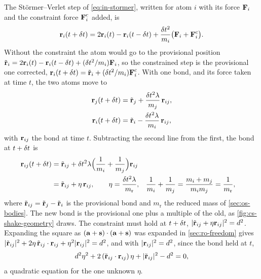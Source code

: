 The Störmer--Verlet step of \cref{eq:in-stormer}, written for atom $i$
with its force $\bm{\mathrm{F}}_i$ and the constraint force $\bm{\mathrm{F}}_i^{\mathrm c}$
added, is
\begin{equation*}
   \bm{\mathrm{r}}_i(t + \delta t) = 2\bm{\mathrm{r}}_i(t) - \bm{\mathrm{r}}_i(t - \delta t)
   + \frac{\delta t^2}{m_i}\bigl(\bm{\mathrm{F}}_i + \bm{\mathrm{F}}_i^{\mathrm c}\bigr) .
\end{equation*}
Without the constraint the atom would go to the provisional position
$\tilde{\bm{\mathrm{r}}}_i = 2\bm{\mathrm{r}}_i(t) - \bm{\mathrm{r}}_i(t - \delta t) +
(\delta t^2/m_i)\bm{\mathrm{F}}_i$, so the constrained step is the provisional one
corrected, $\bm{\mathrm{r}}_i(t + \delta t) = \tilde{\bm{\mathrm{r}}}_i +
(\delta t^2/m_i)\bm{\mathrm{F}}_i^{\mathrm c}$. With one bond, and its force taken at
time $t$, the two atoms move to
\begin{align*}
   \bm{\mathrm{r}}_j(t + \delta t) &= \tilde{\bm{\mathrm{r}}}_j
      + \frac{\delta t^2\lambda}{m_j}\,\bm{\mathrm{r}}_{ij} ,\\
   \bm{\mathrm{r}}_i(t + \delta t) &= \tilde{\bm{\mathrm{r}}}_i
      - \frac{\delta t^2\lambda}{m_i}\,\bm{\mathrm{r}}_{ij} ,
\end{align*}
with $\bm{\mathrm{r}}_{ij}$ the bond at time $t$. Subtracting the second line from
the first, the bond at $t + \delta t$ is
\begin{align*}
   \bm{\mathrm{r}}_{ij}(t + \delta t)
   &= \tilde{\bm{\mathrm{r}}}_{ij} + \delta t^2\lambda\Bigl(\frac{1}{m_i}
      + \frac{1}{m_j}\Bigr)\bm{\mathrm{r}}_{ij}\\
   &= \tilde{\bm{\mathrm{r}}}_{ij} + \eta\,\bm{\mathrm{r}}_{ij} ,
   \qquad \eta = \frac{\delta t^2\lambda}{m_{\mathrm r}} ,
   && \text{$\frac1{m_i} + \frac1{m_j} = \frac{m_i + m_j}{m_im_j}
      = \frac{1}{m_{\mathrm r}}$,}
\end{align*}
where $\tilde{\bm{\mathrm{r}}}_{ij} = \tilde{\bm{\mathrm{r}}}_j - \tilde{\bm{\mathrm{r}}}_i$ is the
provisional bond and $m_{\mathrm r}$ the reduced mass of
\cref{sec:os-bodies}. The new bond is the provisional one plus a multiple
of the old, as \cref{fig:cs-shake-geometry} draws. The constraint must
hold at $t + \delta t$, $\lvert\tilde{\bm{\mathrm{r}}}_{ij} + \eta\bm{\mathrm{r}}_{ij}\rvert^2 =
d^2$. Expanding the square as $(\bm{\mathrm{a}} + \bm{\mathrm{s}})\cdot(\bm{\mathrm{a}} + \bm{\mathrm{s}})$
was expanded in \cref{sec:ro-freedom} gives $\lvert\tilde{\bm{\mathrm{r}}}_{ij}
\rvert^2 + 2\eta\,\tilde{\bm{\mathrm{r}}}_{ij}\cdot\bm{\mathrm{r}}_{ij} + \eta^2\lvert
\bm{\mathrm{r}}_{ij}\rvert^2 = d^2$, and with $\lvert\bm{\mathrm{r}}_{ij}\rvert^2 = d^2$,
since the bond held at $t$,
\begin{equation}
   d^2\eta^2 + 2\,(\tilde{\bm{\mathrm{r}}}_{ij}\cdot\bm{\mathrm{r}}_{ij})\,\eta
   + \lvert\tilde{\bm{\mathrm{r}}}_{ij}\rvert^2 - d^2 = 0 ,
   \label{eq:cs-quadratic}
\end{equation}
a quadratic equation for the one unknown $\eta$.

